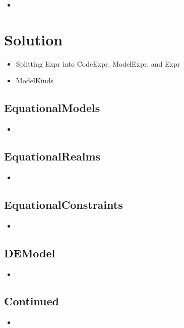 \begin{itemize}
    \item {}
\end{itemize}

\section{Solution}

\begin{itemize}
    \item Splitting Expr into CodeExpr, ModelExpr, and Expr
    \item ModelKinds
\end{itemize}

\subsection{EquationalModels}

\begin{itemize}
    \item {}
\end{itemize}

\subsection{EquationalRealms}

\begin{itemize}
    \item {}
\end{itemize}

\subsection{EquationalConstraints}

\begin{itemize}
    \item {}
\end{itemize}

\subsection{DEModel}

\begin{itemize}
    \item {}
\end{itemize}

\subsection{Continued}

\begin{itemize}
    \item {}
\end{itemize}

